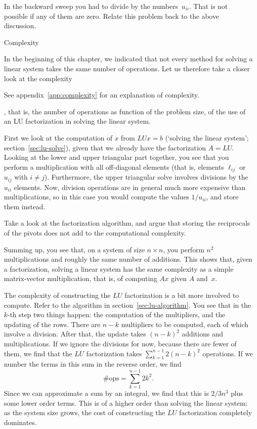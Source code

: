 \begin{exercise}
  In the backward sweep you had to divide by the
  numbers~$u_{ii}$. That is not possible if any of them are zero.
  Relate this problem back to the above discussion. 
\end{exercise}

 {Complexity}

In the beginning of this chapter, we indicated that not every method
for solving a linear system takes the same number of operations. Let
us therefore take a closer look at the complexity
\begin{footnoteenv}
  {See
    appendix~\ref{app:complexity} for an explanation of complexity.}
\end{footnoteenv}
,
that is, the number of operations as function of the problem size, of
the use of an LU factorization in solving the linear system.

First we look at the computation of $x$ from $LUx=b$
(`solving the linear system'; section~\ref{sec:lu-solve}), given that
we already have the factorization $A=LU$.
Looking at the lower and upper
triangular part together, you see that you perform a multiplication
with all off-diagonal elements (that is, elements $\ell_{ij}$
or~$u_{ij}$ with $i\not=j$). Furthermore, the upper triangular solve
involves divisions by the $u_{ii}$ elements. Now, division operations
are in general much more expensive than multiplications, so in this
case you would compute the values $1/u_{ii}$, and store them instead.

\begin{exercise}
  Take a look at the factorization algorithm, and argue that storing
  the reciprocals of the pivots does not add to the computational
  complexity.
\end{exercise}

Summing up, you see that, on a system of size $n\times n$, you perform
$n^2$ multiplications and roughly the same number of additions.
This shows that, given a factorization, solving a linear system
has the same complexity as a simple matrix-vector multiplication,
that is, of computing $Ax$ given $A$ and~$x$.

The complexity of constructing the $LU$ factorization is a bit more
involved to compute. Refer to the algorithm in section~\ref{sec:lu-algorithm}.
You see that in the $k$-th step two things happen: the computation of
the multipliers, and the updating of the rows.
%
There are $n-k$ multipliers to be computed, each of which involve a
division. After that, the update takes $(n-k)^2$ additions and
multiplications. If we ignore the divisions for now, because there are
fewer of them, we find that the $LU$ factorization takes
$\sum_{k=1}^{n-1} 2(n-k)^2$
operations. If we number the terms in this sum in the reverse order,
we find \[ \#\mathrm{ops}=\sum_{k=1}^{n-1} 2k^2. \]
Since we can approximate a sum by an integral,
we find that this is $2/3n^3$ plus some lower
order terms. This is of a higher order than solving the linear system:
as the system size grows, the cost of constructing the $LU$
factorization completely dominates.

